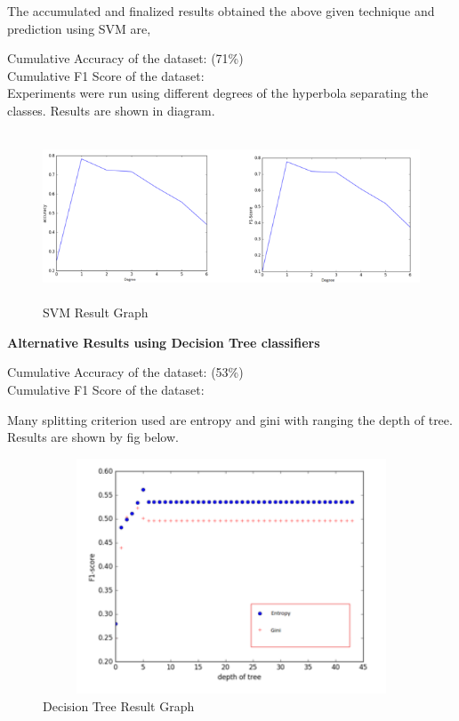 The accumulated and finalized results obtained the above given technique and prediction using SVM are,

  Cumulative Accuracy of the dataset:	\quad{} (71\%) \\
 Cumulative F1 Score of the dataset:	\quad{} \\

Experiments were run using different degrees of the hyperbola separating the classes. Results are shown in diagram. 
\begin{figure}[!htb]
	\begin{center}
		\includegraphics[height=5cm,width=14cm]{ThesisFigs/svmgraph}
		\caption{SVM Result Graph}\label{fig:svmgraph}
	\end{center}
\end{figure}




\textbf{	Alternative Results using Decision Tree classifiers}

\hfill \break Cumulative Accuracy of the dataset:	\quad{} (53\%) \\
  Cumulative F1 Score of the dataset:	\quad{} 

Many splitting criterion used are entropy and gini with ranging the depth of tree. Results are shown by fig below. 
\clearpage
\begin{figure}[!htb]
	\begin{center}
		\includegraphics[height=7cm,width=12cm]{ThesisFigs/decisiontreegraph}
		\caption{Decision Tree Result Graph}\label{fig:decisiontreegraph}
	\end{center}
\end{figure}

